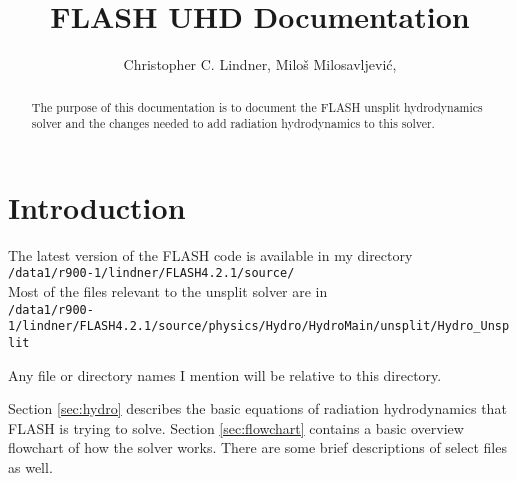 \documentclass[preprint,11pt]{aastex}
\begin{document}
	

\title{FLASH UHD Documentation}
\author{
Christopher C. Lindner,
Milo\v s Milosavljevi\'c,
}


\begin{abstract}
The purpose of this documentation is to document the FLASH unsplit hydrodynamics solver and the changes needed to add radiation hydrodynamics to this solver.

\keywords{ }


\end{abstract}

\section{Introduction}
\label{sec:intro}
\setcounter{footnote}{0}

The latest version of the FLASH code is available in my directory \\
\verb!/data1/r900-1/lindner/FLASH4.2.1/source/! \\

Most of the files relevant to the unsplit solver are in \\
\verb!/data1/r900-1/lindner/FLASH4.2.1/source/physics/Hydro/HydroMain/unsplit/Hydro_Unsplit!

Any file or directory names I mention will be relative to this directory.

Section \ref{sec:hydro} describes the basic equations of radiation hydrodynamics that FLASH is trying to solve.  Section \ref{sec:flowchart} contains a basic overview flowchart of how the solver works.  There are some brief descriptions of select files as well.
\end{document}

